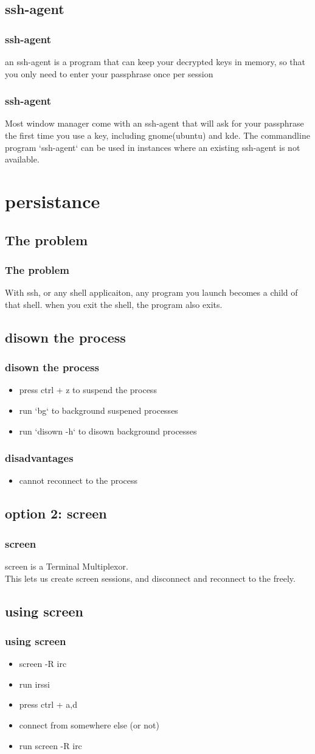 \documentclass[hyperref={pdfpagelabels=false}]{beamer}
\begin{document}
\subsection{ssh-agent}
\frame
{
    \frametitle{ssh-agent}
    an ssh-agent is a program that can keep your decrypted keys in memory, so that you only need to enter your passphrase once per session
}
\frame
{
    \frametitle{ssh-agent}
    Most window manager come with an ssh-agent that will ask for your passphrase the first time you use a key, including gnome(ubuntu) and kde.  The commandline program `ssh-agent` can be used in instances where an existing ssh-agent is not available.
}
\section{persistance}
\subsection{The problem}
\frame
{
    \frametitle{The problem}
    With ssh, or any shell applicaiton, any program you launch becomes a child of that shell.  when you exit the shell, the program also exits.

}
\subsection{disown the process}
\frame
{
  \frametitle{disown the process}
  \begin{itemize}
  \item{press ctrl + z to suspend the process}
  \item{run `bg` to background suspened processes}
  \item{run `disown -h` to disown background processes}
  \end{itemize}
}
\frame
{
    \frametitle{disadvantages}
    \begin{itemize}
    \item{cannot reconnect to the process}
    \end{itemize}
}
\subsection{option 2: screen}
\frame
{
  \frametitle{screen}
  screen is a Terminal Multiplexor.\\
  This lets us create screen sessions, and disconnect and reconnect to the freely.
}
\subsection{using screen}
\frame
{
  \frametitle{using screen}
  \begin{itemize}
  \item{screen -R irc}
  \item{run irssi}
  \item{press ctrl + a,d}
  \item{connect from somewhere else (or not)}
  \item{run screen -R irc}
  \end{itemize}
}
\end{document}
